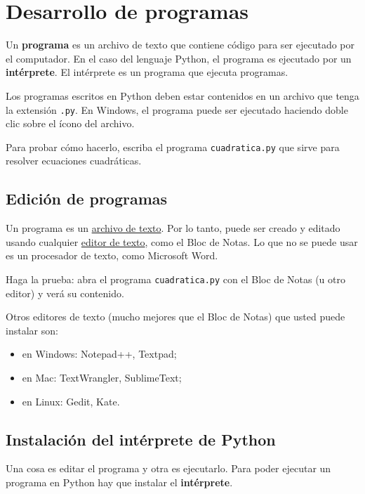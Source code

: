 \chapter{Desarrollo de programas}

Un \textbf{programa} es un archivo de texto que contiene código para ser
ejecutado por el computador.
En el caso del lenguaje Python, el programa es ejecutado por un
\textbf{intérprete}. El intérprete es un programa que ejecuta programas.

Los programas escritos en Python deben estar contenidos en un archivo
que tenga la extensión \lstinline!.py!. En Windows, el programa puede
ser ejecutado haciendo doble clic sobre el ícono del archivo.

Para probar cómo hacerlo, escriba el programa \verb!cuadratica.py!
que sirve para resolver ecuaciones cuadráticas.

\section{Edición de programas}

Un programa es un
\href{http://es.wikipedia.org/wiki/Archivo\_de\_texto}{archivo de
texto}. Por lo tanto, puede ser creado y editado usando cualquier
\href{http://es.wikipedia.org/wiki/Editor\_de\_texto}{editor de texto},
como el Bloc de Notas.
Lo que no se puede usar es un procesador de texto, como Microsoft Word.

Haga la prueba: abra el programa \lstinline!cuadratica.py! con el Bloc
de Notas (u otro editor) y verá su contenido.

Otros editores de texto (mucho mejores que el Bloc de Notas) que usted
puede instalar son:

\begin{itemize}
  \item en Windows: Notepad++, Textpad;
  \item en Mac: TextWrangler, SublimeText;
  \item en Linux: Gedit, Kate.
\end{itemize}

\section{Instalación del intérprete de Python}

Una cosa es editar el programa y otra es ejecutarlo. Para poder
ejecutar un programa en Python hay que instalar el \textbf{intérprete}.

